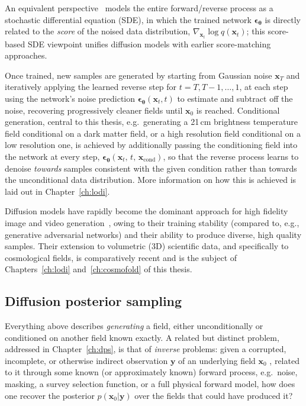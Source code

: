 An equivalent perspective~\citep{song_score-based_2021} models the entire forward/reverse process as a stochastic differential equation (SDE), in which the trained network $\bm{\epsilon}_{\bm{\theta}}$ is directly related to the \emph{score} of the noised data distribution, $\nabla_{\bm{x}_t}\log q(\bm{x}_t)$; this score-based SDE viewpoint unifies diffusion models with earlier score-matching approaches.

Once trained, new samples are generated by starting from Gaussian noise $\bm{x}_T$ and iteratively applying the learned reverse step for $t=T,T-1,\dots,1$, at each step using the network's noise prediction $\bm{\epsilon}_{\bm{\theta}}(\bm{x}_t,t)$ to estimate and subtract off the noise, recovering progressively cleaner fields until $\bm{x}_0$ is reached. Conditional generation, central to this thesis, e.g.\ generating a 21\,cm brightness temperature field conditional on a dark matter field, or a high resolution field conditional on a low resolution one, is achieved by additionally passing the conditioning field into the network at every step, $\bm{\epsilon}_{\bm{\theta}}(\bm{x}_t,\,t,\,\bm{x}_\text{cond})$, so that the reverse process learns to denoise \emph{towards} samples consistent with the given condition rather than towards the unconditional data distribution. More information on how this is achieved is laid out in Chapter~\ref{ch:lodi}.


Diffusion models have rapidly become the dominant approach for high fidelity image and video generation~\citep{dhariwal_diffusion_2021}, owing to their training stability (compared to, e.g., generative adversarial networks) and their ability to produce diverse, high quality samples. Their extension to volumetric (3D) scientific data, and specifically to cosmological fields, is comparatively recent and is the subject of Chapters~\ref{ch:lodi} and~\ref{ch:cosmofold} of this thesis.



\subsection{Diffusion posterior sampling}
\label{sec:dps_formulation}

Everything above describes \emph{generating} a field, either unconditionally or conditioned on another field known exactly. A related but distinct problem, addressed in Chapter~\ref{ch:dps}, is that of \emph{inverse} problems: given a corrupted, incomplete, or otherwise indirect observation $\bm{y}$ of an underlying field $\bm{x}_0$ , related to it through some known (or approximately known) forward process, e.g.\ noise, masking, a survey selection function, or a full physical forward model, how does one recover the posterior $p(\bm{x}_0|\bm{y})$ over the fields that could have produced it?

